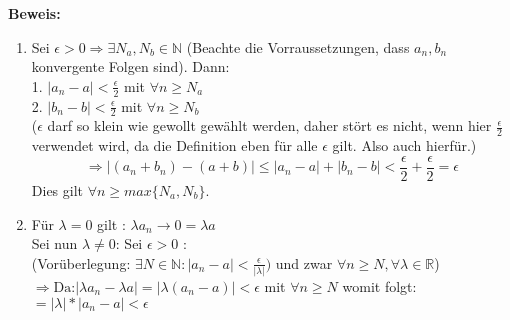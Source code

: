 \documentclass[12pt]{article}
\begin{document}
\textbf{Beweis:}\\
\begin{enumerate}[\bfseries i)]
	\item Sei $\epsilon >0 \Rightarrow \exists N_a, N_b \in \mathbb{N}$ (Beachte die Vorraussetzungen, dass $a_n, b_n$ konvergente Folgen sind). Dann:\\
	1. $|a_n -a | < \frac{\epsilon}{2}$ mit $\forall n \geq N_a$\\
	2. $|b_n -b | < \frac{\epsilon}{2}$ mit $\forall n \geq N_b$\\
	($\epsilon$ darf so klein wie gewollt gewählt werden, daher stört es nicht, wenn hier $\frac{\epsilon}{2}$ verwendet wird, da die Definition eben für alle $\epsilon$ gilt. Also auch hierfür.)
	$$ \Rightarrow |(a_n + b_n) - (a+b)| \leq | a_n -a | + |b_n -b| < \frac{\epsilon}{2} +\frac{\epsilon}{2} = \epsilon$$
	Dies gilt $\forall n \geq max\{N_a,N_b\}$.\\
	
	\item Für $\lambda = 0$ gilt : $\lambda a_n \rightarrow 0 = \lambda a$\\
	Sei nun $\lambda \neq 0$: Sei $\epsilon > 0$ :\\
	(Vorüberlegung: $\exists N \in \mathbb{N}: |a_n -a| < \frac{\epsilon}{|\lambda|})$ und zwar $\forall n \geq N, \forall \lambda \in \mathbb{R}$)\\
	$\Rightarrow \text{Da:} |\lambda a_n -\lambda a| = | \lambda (a_n - a)| < \epsilon$ mit $\forall n \geq N$ womit folgt:\\
	$=|\lambda| *|a_n -a | < \epsilon$\\
	

\end{enumerate}
\end{document}
